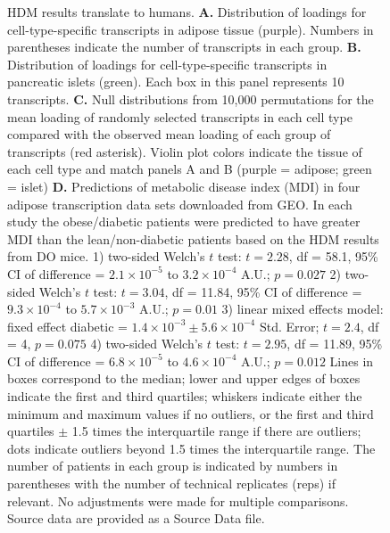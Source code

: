 \documentclass[
]{article}
\begin{document}
\begin{figure}[ht!]
\caption{HDM results translate to humans. \textbf{A.} Distribution of 
loadings for cell-type-specific transcripts in adipose tissue
(purple). Numbers in parentheses indicate the number of 
transcripts in each group. \textbf{B.} Distribution of loadings 
for cell-type-specific transcripts in pancreatic islets (green). 
Each box in this panel represents 10 transcripts. \textbf{C.} 
Null distributions from 10,000 permutations for the mean 
loading of randomly selected transcripts in each cell type 
compared with the observed mean loading of each group 
of transcripts (red asterisk). Violin plot colors indicate the 
tissue of each cell type and match panels A and B 
(purple = adipose; green = islet) \textbf{D.} Predictions of 
metabolic disease index (MDI) in four adipose transcription 
data sets downloaded from GEO. In each study the 
obese/diabetic patients were predicted to have greater 
MDI than the lean/non-diabetic patients based on the 
HDM results from DO mice. 1) two-sided Welch's $t$ test: $t = 2.28$, 
df = 58.1, 95\% CI of difference = $2.1\times10^{-5}$ 
to $3.2\times10^{-4}$ A.U.; $p = 0.027$
2) two-sided Welch's $t$ test: $t = 3.04$, 
df = 11.84, 95\% CI of difference = $9.3\times10^{-4}$ 
to $5.7\times10^{-3}$ A.U.; $p = 0.01$
3) linear mixed effects model: 
fixed effect diabetic = 
$1.4\times10^{-3}\pm5.6\times10^{-4}$ Std. Error;
$t = 2.4$, df = 4, $p = 0.075$
4) two-sided Welch's $t$ test: $t = 2.95$, 
df = 11.89, 95\% CI of difference = $6.8\times10^{-5}$ 
to $4.6\times10^{-4}$ A.U.; $p = 0.012$
Lines in boxes correspond to the 
median; lower and upper edges of boxes indicate the 
first and third quartiles; whiskers indicate either the minimum
and maximum values if no outliers, or the first and third quartiles 
$\pm$ 1.5 times the interquartile range if there are outliers; 
dots indicate outliers beyond 1.5 times the interquartile range. 
The number of patients in each group is indicated by numbers 
in parentheses with the number of technical replicates (reps) if 
relevant. No adjustments were made for multiple comparisons. 
Source data are provided as a Source Data file.
}
\label{fig:human_translation}
\end{figure}
\end{document}
